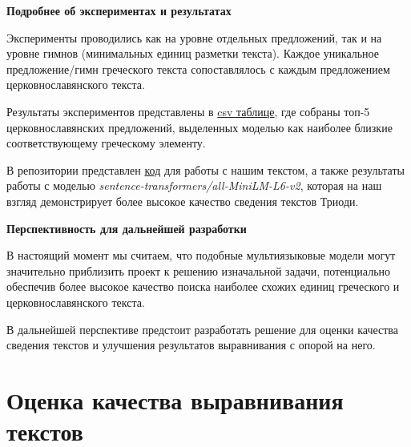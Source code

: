 \documentclass[
  letterpaper,
]{book}
\begin{document}
\begin{tcolorbox}[enhanced jigsaw, opacityback=0, toprule=.15mm, breakable, arc=.35mm, colback=white, left=2mm, bottomrule=.15mm, leftrule=.75mm, colframe=quarto-callout-note-color-frame, rightrule=.15mm]

\textbf{Подробнее об экспериментах и результатах}\vspace{2mm}

Эксперименты проводились как на уровне отдельных предложений, так и на
уровне гимнов (минимальных единиц разметки текста). Каждое уникальное
предложение/гимн греческого текста сопоставлялось с каждым предложением
церковнославянского текста.

Результаты экспериментов представлены в
\href{https://github.com/Drozhzhinastya/GSPC/tree/main/csv/sbert}{csv
таблице}, где собраны топ-5 церковнославянских предложений, выделенных
моделью как наиболее близкие соответствующему греческому элементу.

\end{tcolorbox}

В репозитории представлен
\href{https://github.com/Drozhzhinastya/GSPC/blob/main/scripts/text-similarity/GSPC_sbert.ipynb}{код}
для работы с нашим текстом, а также результаты работы с моделью
\emph{sentence-transformers/all-MiniLM-L6-v2}, которая на наш взгляд
демонстрирует более высокое качество сведения текстов Триоди.

\begin{tcolorbox}[enhanced jigsaw, opacityback=0, toprule=.15mm, breakable, arc=.35mm, colback=white, left=2mm, bottomrule=.15mm, leftrule=.75mm, colframe=quarto-callout-tip-color-frame, rightrule=.15mm]

\textbf{Перспективность для дальнейшей разработки}\vspace{2mm}

В настоящий момент мы считаем, что подобные мультиязыковые модели могут
значительно приблизить проект к решению изначальной задачи, потенциально
обеспечив более высокое качество поиска наиболее схожих единиц
греческого и церковнославянского текста.

В дальнейшей перспективе предстоит разработать решение для оценки
качества сведения текстов и улучшения результатов выравнивания с опорой
на него.

\end{tcolorbox}


\hypertarget{sec-about_evluation}{%
\chapter{Оценка качества выравнивания
текстов}\label{sec-about_evluation}}
\end{document}
